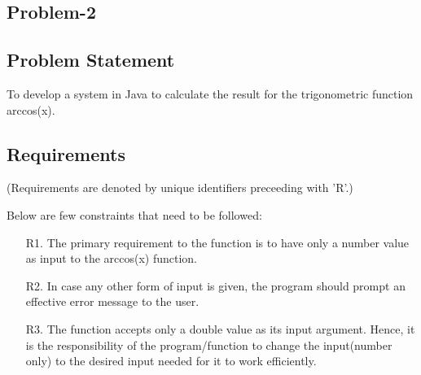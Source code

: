 \documentclass[12pt]{report}
\begin{document}
\pagebreak

	
	\begin{center}
		\section{Problem-2} 		
	\end{center}
		\subsection{Problem Statement}
		To develop a system in Java to calculate the result for the trigonometric function arccos(x).
		
	\begin{flushleft}
		\subsection{Requirements}
		\small (Requirements are denoted by unique identifiers preceeding with 'R'.)
	\end{flushleft}
	Below are few constraints that need to be followed:
	\begin{itemize}
		\item[R1.] The primary requirement to the function is to have only a number value as input to the arccos(x) function. 
		\item[R2.] In case any other form of input is given, the program should prompt an effective error message to the user.
		\item[R3.] The function accepts only a double value as its input argument. Hence, it is the responsibility of the program/function to change the input(number only) to the desired input needed for it to work efficiently.
	\end{itemize}
		
\end{document}
